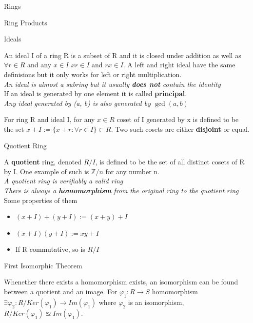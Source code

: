 \documentclass[12pt, letterpaper]{article}
\begin{document}
\begin{section}{Rings}
\begin{subsection}{Ring Products}
  \end{subsection}

  \begin{subsection}{Ideals}

    An ideal I of a ring R is a subset of R and it is closed under addition as
    well as \(\forall r \in R\) and any \(x \in I\) \(xr \in I\) and \(rx \in I\).
    A left and right ideal have the same definisions but it only works for left
    or right multiplication. \\
    \emph{An ideal is almost a subring but it usually \textbf{does not} contain
      the identity} \\
    If an ideal is generated by one element it is called \textbf{principal}. \\
    \emph{Any ideal generated by (a, b) is also generated by \(\gcd(a, b)\)}

    For ring R and ideal I, for any \(x \in R\) coset of I generated by x is
    defined to be the set \(x + I := \{x + r : \forall r \in I \} \subset R\). Two such
    cosets are either \textbf{disjoint} or equal.

    \begin{subsubsection}{Quotient Ring}

      A \textbf{quotient} ring, denoted \(R/I\), is defined to be the set of
      all distinct cosets of R by I. One example of such is \(\mathbb{Z}/n\) for
      any number n. \\
      \emph{A quotient ring is verifiably a valid ring} \\
      \emph{There is always a \textbf{homomorphism} from the original ring to
      the quotient ring} \\
      Some properties of them
      \begin{itemize}
        \item \((x + I) + (y + I) := (x + y) + I\)
        \item \((x + I)(y + I) := xy + I\)
        \item If R commutative, so is \(R/I\)
      \end{itemize}

    \end{subsubsection}

    \begin{subsubsection}{First Isomorphic Theorem}

      Whenether there exists a homomorphism exists, an isomorphism can be found
      between a quotient and an image. For \(\varphi_{1}: R \to S\) homomorphism
      \(\exists \varphi_{2}:R/Ker(\varphi_{1}) \to Im(\varphi_{1})\) where \(\varphi_{2}\) is
      an isomorphism, \(R/Ker(\varphi_{1}) \approxeq Im(\varphi_{1})\).


\end{subsubsection}
\end{subsection}
\end{section}
\end{document}
